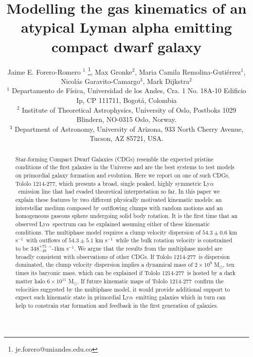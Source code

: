 \documentclass[a4paper,fleqn,usenatbib]{mnras}
\newcommand{\tol}{Tololo 1214-277}
\newcommand{\lya}{\ifmmode{{\rm Ly}\alpha}\else Ly$\alpha$\ \fi}
\newcommand{\kms}{\ifmmode\mathrm{km\ s}^{-1}\else km s$^{-1}$\fi}
\newcommand{\sigmaclump}{$54.3\pm 0.6$ km s$^{-1}$}
\newcommand{\inftyclump}{$54.3\pm 5.1$ km s$^{-1}$}
\begin{document}
\title[An atypical \lya dwarf galaxy]{
Modelling the gas kinematics of an atypical Lyman alpha emitting compact dwarf galaxy}
\author[J.E. Forero-Romero et al.]
{Jaime E. Forero-Romero $^{1}$ \thanks{je.forero@uniandes.edu.co},
Max Gronke$^2$, 
Maria Camila Remolina-Guti\'errez$^1$,
\newauthor
Nicol\'as Garavito-Camargo$^3$, 
Mark Dijkstra$^2$\\
$^1$ Departamento de F\'isica, Universidad de los Andes, Cra. 1
  No. 18A-10 Edificio Ip, CP 111711, Bogot\'a, Colombia \\
$^2$ Institute of Theoretical Astrophysics, University of Oslo,
Postboks 1029 Blindern, NO-0315 Oslo, Norway.\\
$^3$ Department of Astronomy, University of Arizona, 933 North Cherry
Avenue, Tucson, AZ 85721, USA. 
}


\maketitle


\begin{abstract}
	
Star-forming Compact Dwarf Galaxies (CDGs) 
resemble the expected pristine conditions of the first galaxies in the
Universe and are the best systems to test models on primordial galaxy
formation and evolution. 
Here we report on one of such CDGs, \tol, which presents
a broad, single peaked, highly symmetric \lya emission line that had
evaded theoretical interpretation so far.  
In this paper we explain these features by two different physically
motivated kinematic models: 
an interstellar medium composed by outflowing clumps with 
random motions and an homogeneous gaseous sphere undergoing solid body
rotation.
It is the first time that an observed \lya spectrum can be explained
assuming either of these kinematic conditions.
The multiphase model requires a clump velocity dispersion of
\sigmaclump\ with outflows of \inftyclump\, while the
bulk rotation velocity is constrained to be $348^{+75}_{-48}$ \kms.
We argue that the results from the multiphase model are broadly
consistent with observations of other CDGs. 
If \tol\ is dispersion dominated, the clump velocity dispersion
implies a dynamical mass of $2\times 10^{9}$ M$_{\odot}$, ten times
its baryonic mass, which can be explained if \tol\ is hosted by a dark
matter halo $6\times 10^{11}$ M$_{\odot}$. 
If future kinematic maps of \tol\ confirm the velocities suggested by
the multiphase model, it would provide additional support to expect
such kinematic state in primordial \lya emitting galaxies which in
turn can help to constrain star formation and feedback in the first
generation of galaxies.
\end{abstract}
\end{document}
